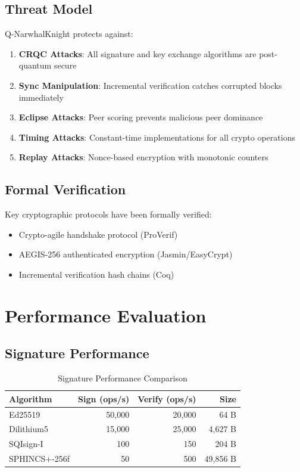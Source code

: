 \documentclass[11pt,a4paper]{article}
\begin{document}
\subsection{Threat Model}

Q-NarwhalKnight protects against:

\begin{enumerate}
    \item \textbf{CRQC Attacks}: All signature and key exchange algorithms are post-quantum secure
    \item \textbf{Sync Manipulation}: Incremental verification catches corrupted blocks immediately
    \item \textbf{Eclipse Attacks}: Peer scoring prevents malicious peer dominance
    \item \textbf{Timing Attacks}: Constant-time implementations for all crypto operations
    \item \textbf{Replay Attacks}: Nonce-based encryption with monotonic counters
\end{enumerate}

\subsection{Formal Verification}

Key cryptographic protocols have been formally verified:

\begin{itemize}
    \item Crypto-agile handshake protocol (ProVerif)
    \item AEGIS-256 authenticated encryption (Jasmin/EasyCrypt)
    \item Incremental verification hash chains (Coq)
\end{itemize}

\section{Performance Evaluation}

\subsection{Signature Performance}

\begin{table}[h]
\centering
\begin{tabular}{lrrr}
\toprule
\textbf{Algorithm} & \textbf{Sign (ops/s)} & \textbf{Verify (ops/s)} & \textbf{Size} \\
\midrule
Ed25519 & 50,000 & 20,000 & 64 B \\
Dilithium5 & 15,000 & 25,000 & 4,627 B \\
SQIsign-I & 100 & 150 & 204 B \\
SPHINCS+-256f & 50 & 500 & 49,856 B \\
\bottomrule
\end{tabular}
\caption{Signature Performance Comparison}
\end{table}
\end{document}
